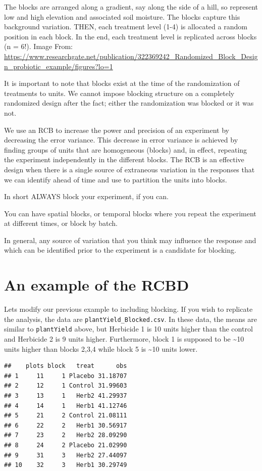 \documentclass[
]{book}
\begin{document}
The blocks are arranged along a gradient, say along the side of a hill, so represent low and high elevation and associated soil moisture. The blocks capture this background variation. THEN, each treatment level (1-4) is allocated a random position in each block. In the end, each treatment level is replicated across blocks (n = 6!). Image From: \url{https://www.researchgate.net/publication/322369242_Randomized_Block_Design_probiotic_example/figures?lo=1}

It is important to note that blocks exist at the time of the randomization of treatments to units. We cannot impose blocking structure on a completely randomized design after the fact; either the randomization was blocked or it was not.

We use an RCB to increase the power and precision of an experiment by decreasing the error variance. This decrease in error variance is achieved by finding groups of units that are homogeneous (blocks) and, in effect, repeating the experiment independently in the different blocks. The RCB is an effective design when there is a single source of extraneous variation in the responses that we can identify ahead of time and use to partition the units into blocks.

In short ALWAYS block your experiment, if you can.

You can have spatial blocks, or temporal blocks where you repeat the experiment at different times, or block by batch.

In general, any source of variation that you think may influence the response and which can be identified prior to the experiment is a candidate for blocking.

\hypertarget{an-example-of-the-rcbd}{%
\section{An example of the RCBD}\label{an-example-of-the-rcbd}}

Lets modify our previous example to including blocking. If you wish to replicate the analysis, the data are \texttt{plantYield\_Blocked.csv}. In these data, the means are similar to \texttt{plantYield} above, but Herbicide 1 is 10 units higher than the control and Herbicide 2 is 9 units higher. Furthermore, block 1 is supposed to be \textasciitilde10 units higher than blocks 2,3,4 while block 5 is \textasciitilde10 units lower.

\begin{verbatim}
##    plots block   treat      obs
## 1     11     1 Placebo 31.18707
## 2     12     1 Control 31.99603
## 3     13     1   Herb2 41.29937
## 4     14     1   Herb1 41.12746
## 5     21     2 Control 21.08111
## 6     22     2   Herb1 30.56917
## 7     23     2   Herb2 28.09290
## 8     24     2 Placebo 21.02990
## 9     31     3   Herb2 27.44097
## 10    32     3   Herb1 30.29749
\end{verbatim}
\end{document}
